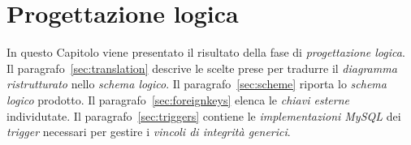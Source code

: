 \chapter{Progettazione logica}
In questo Capitolo viene presentato il risultato della fase di {\it progettazione logica}. Il
paragrafo~\vref{sec:translation} descrive le scelte prese per tradurre il {\it diagramma
ristrutturato} nello {\it schema logico}. Il paragrafo~\vref{sec:scheme} riporta lo
{\it schema logico} prodotto. Il paragrafo~\vref{sec:foreignkeys} elenca le {\it chiavi
esterne} individutate. Il paragrafo~\vref{sec:triggers} contiene le {\it implementazioni MySQL}
dei {\it trigger} necessari per gestire i {\it vincoli di integrità generici}.




